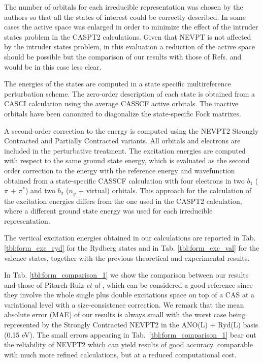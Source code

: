 

The number of orbitals for each irreducible representation
was chosen by the authors so that all the states of interest could be
correctly described. In some cases the active space was enlarged in order
to minimize the effect of the intruder states problem in the CASPT2
calculations.  Given that NEVPT is not affected by the intruder states
problem, in this evaluation a reduction of the active space should be
possible but the comparison of our results with those of Refs.
 and  would be in this case less
clear.

The energies of the states are computed in a state specific multireference
perturbation scheme.  The zero-order description of each state is obtained
from a CASCI calculation using the average CASSCF active orbitals. The
inactive orbitals have been canonized to diagonalize the state-specific Fock
matrixes.

A second-order correction to the energy is computed using the NEVPT2 Strongly
Contracted and Partially Contracted variants. All orbitals and
electrons are included in the perturbative treatment. The excitation
energies are computed with respect to the same ground state energy, which is
evaluated as the second order correction to the energy with the reference
energy and wavefunction obtained from a state-specific CASSCF calculation
with four electrons in two $b_1$ ($\pi$ + $\pi^*$) and two $b_2$ ($n_y$ +
virtual) orbitals. This approach for the calculation of the excitation
energies differs from the one used in the CASPT2 calculation, where a
different ground state energy was used for each irreducible representation.



The vertical excitation energies obtained in our calculations are reported
in Tab. \ref{tbl:form_exc_ryd} for the Rydberg states and in Tab.
\ref{tbl:form_exc_val} for the valence states, together with the previous
theoretical and experimental results.

In Tab. \ref{tbl:form_comparison_1} we show the comparison between our
results and those of Pitarch-Ruiz {\it et al} \cite{mp-101-483-2003}, which
can be considered a good reference since they involve the whole single plus
double excitations space on top of a CAS at a variational level with a
size-consistence correction. We remark that the mean absolute error (MAE) of
our results is always small with the worst case being represented by the
Strongly Contracted NEVPT2 in the ANO(L) + Ryd(L) basis (0.15 eV).  The small
errors appearing in Tab.~\ref{tbl:form_comparison_1} bear out the
reliability of NEVPT2 which can yield results of good accuracy, comparable
with much more refined calculations, but at a reduced computational cost.

